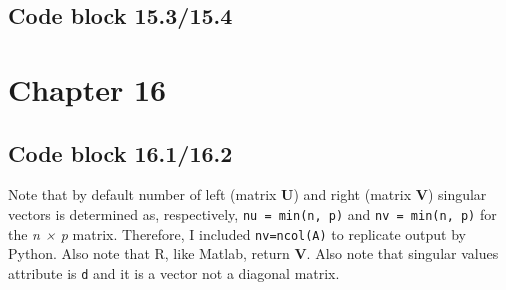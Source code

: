 \documentclass[
]{book}
\newenvironment{Shaded}{\begin{snugshade}}{\end{snugshade}}
\newcommand{\DataTypeTok}[1]{\textcolor[rgb]{0.13,0.29,0.53}{#1}}
\newcommand{\DecValTok}[1]{\textcolor[rgb]{0.00,0.00,0.81}{#1}}
\newcommand{\KeywordTok}[1]{\textcolor[rgb]{0.13,0.29,0.53}{\textbf{#1}}}
\newcommand{\NormalTok}[1]{#1}
\newcommand{\OperatorTok}[1]{\textcolor[rgb]{0.81,0.36,0.00}{\textbf{#1}}}
\newcommand{\StringTok}[1]{\textcolor[rgb]{0.31,0.60,0.02}{#1}}
\begin{document}
\hypertarget{code-block-15.315.4}{%
\subsection*{Code block 15.3/15.4}\label{code-block-15.315.4}}

\begin{Shaded}
\end{Shaded}

\hypertarget{chapter-16}{%
\section*{Chapter 16}\label{chapter-16}}

\hypertarget{code-block-16.116.2}{%
\subsection*{Code block 16.1/16.2}\label{code-block-16.116.2}}

Note that by default number of left (matrix \textbf{U}) and right (matrix \textbf{V}) singular vectors is determined as, respectively, \texttt{nu\ =\ min(n,\ p)} and \texttt{nv\ =\ min(n,\ p)} for the \emph{n × p} matrix. Therefore, I included \texttt{nv=ncol(A)} to replicate output by Python. Also note that R, like Matlab, return \textbf{V}. Also note that singular values attribute is \texttt{d} and it is a vector not a diagonal matrix.
\end{document}

